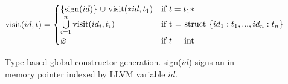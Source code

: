 \begin{figure}[h]
\small
\begin{equation*}
\text{visit($id,t$)} = 
  \begin{cases}
  \text{\{sign$(id)$\} $\cup$ visit$(*id, t_1)$} & \text{if $t = t_1*$}\\
  $$\bigcup\limits_{i=1}^{n} \text{visit$(id_i, t_i)$}$$
  &\text{if t = struct $\{id_1:t_1, ..., id_n:t_n\}$}\\
  $$\varnothing$$ &\text{if $t$ = int}
  \end{cases}
\end{equation*}
\caption{Type-based global constructor generation. sign($id$) signs an in-memory pointer indexed by LLVM variable $id$.}
\label{fig:glob}
\end{figure}

